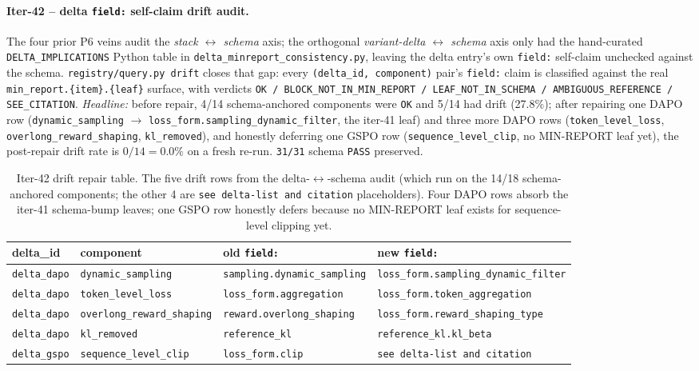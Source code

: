 \paragraph{Iter-42 -- delta \texttt{field:} self-claim drift audit.}
The four prior P6 veins audit the \emph{stack $\leftrightarrow$ schema} axis;
the orthogonal \emph{variant-delta $\leftrightarrow$ schema} axis only had the
hand-curated \texttt{DELTA\_IMPLICATIONS} Python table in
\texttt{delta\_minreport\_consistency.py}, leaving the delta entry's
own \texttt{field:} self-claim unchecked against the schema.
\texttt{registry/query.py drift} closes that gap: every
\texttt{(delta\_id, component)} pair's \texttt{field:} claim is classified
against the real \texttt{min\_report.\{item\}.\{leaf\}} surface, with verdicts
\texttt{OK / BLOCK\_NOT\_IN\_MIN\_REPORT / LEAF\_NOT\_IN\_SCHEMA /
AMBIGUOUS\_REFERENCE / SEE\_CITATION}.
\emph{Headline:} before repair, 4/14 schema-anchored components were
\texttt{OK} and 5/14 had drift (27.8\%); after repairing one DAPO row
(\texttt{dynamic\_sampling} $\to$ \texttt{loss\_form.sampling\_dynamic\_filter},
the iter-41 leaf) and three more DAPO rows (\texttt{token\_level\_loss},
\texttt{overlong\_reward\_shaping}, \texttt{kl\_removed}), and honestly deferring
one GSPO row (\texttt{sequence\_level\_clip}, no MIN-REPORT leaf yet), the
post-repair drift rate is $0/14 = 0.0\%$ on a fresh re-run. \texttt{31/31}
schema \texttt{PASS} preserved.

\begin{table}[ht]
\centering
\small
\begin{tabular}{l l l l}
\toprule
delta\_id & component & old \texttt{field:} & new \texttt{field:} \\
\midrule
\texttt{delta\_dapo} & \texttt{dynamic\_sampling} & \texttt{sampling.dynamic\_sampling} & \texttt{loss\_form.sampling\_dynamic\_filter} \\
\texttt{delta\_dapo} & \texttt{token\_level\_loss} & \texttt{loss\_form.aggregation} & \texttt{loss\_form.token\_aggregation} \\
\texttt{delta\_dapo} & \texttt{overlong\_reward\_shaping} & \texttt{reward.overlong\_shaping} & \texttt{loss\_form.reward\_shaping\_type} \\
\texttt{delta\_dapo} & \texttt{kl\_removed} & \texttt{reference\_kl} & \texttt{reference\_kl.kl\_beta} \\
\texttt{delta\_gspo} & \texttt{sequence\_level\_clip} & \texttt{loss\_form.clip} & \texttt{see delta-list and citation} \\
\bottomrule
\end{tabular}
\caption{Iter-42 drift repair table. The five drift rows from the
delta-$\leftrightarrow$-schema audit (which run on the 14/18 schema-anchored
components; the other 4 are \texttt{see delta-list and citation} placeholders).
Four DAPO rows absorb the iter-41 schema-bump leaves; one GSPO row honestly
defers because no MIN-REPORT leaf exists for sequence-level clipping yet.}
\label{tab:p6-delta-field-drift}
\end{table}

